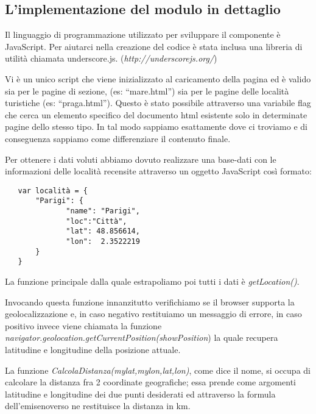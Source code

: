 \subsection{\textbf{L'implementazione del modulo in dettaglio}}

\begin{flushleft}
Il linguaggio di programmazione utilizzato per sviluppare il componente è JavaScript.
Per aiutarci nella creazione del codice è stata inclusa una libreria di utilità chiamata underscore.js.
(\textit{http://underscorejs.org/})
\end{flushleft}
\begin{flushleft}
Vi è un unico script che viene inizializzato al caricamento della pagina ed è valido sia per le pagine di sezione, (es: “mare.html”) sia per le pagine delle località turistiche (es: “praga.html”).
Questo è stato possibile  attraverso una variabile flag che cerca un elemento specifico del documento html esistente solo in determinate pagine dello stesso tipo. In tal modo sappiamo esattamente dove ci troviamo e di conseguenza sappiamo come differenziare il contenuto finale.
\end{flushleft}

\begin{flushleft}
Per ottenere i dati voluti abbiamo dovuto realizzare una base-dati con le informazioni delle località recensite attraverso un oggetto JavaScript così formato:
\end{flushleft}
\begin{verbatim}
   var località = {
       "Parigi": {
	          "name": "Parigi",
	          "loc":"Città",
	          "lat": 48.856614,
	          "lon":  2.3522219
       }
   }
\end{verbatim}
\begin{flushleft}
La funzione principale dalla quale estrapoliamo poi tutti i dati è \textit{getLocation()}.

Invocando questa funzione innanzitutto verifichiamo se il browser supporta la geolocalizzazione e, in caso negativo restituiamo un messaggio di errore, in caso positivo invece viene chiamata la funzione \textit{navigator.geolocation.getCurrentPosition(showPosition}) la quale recupera latitudine e longitudine della posizione attuale.
\end{flushleft}
\begin{flushleft}
La funzione \textit{CalcolaDistanza(mylat,mylon,lat,lon)}, come dice il nome, si occupa di calcolare la distanza fra 2 coordinate geografiche; essa prende come argomenti latitudine e longitudine dei due punti desiderati ed attraverso la formula dell'emisenoverso ne restituisce la distanza in km.
\end{flushleft}

